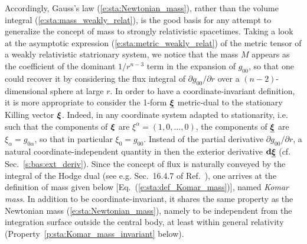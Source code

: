 Accordingly, Gauss's law (\ref{e:sta:Newtonian_mass}), rather than the volume integral
(\ref{e:sta:mass_weakly_relat}), is the good basis for any attempt to
generalize the concept of mass to strongly relativistic spacetimes.
Taking a look at the asymptotic expression (\ref{e:sta:metric_weakly_relat}) of the metric tensor
of a weakly relativistic statrionary system, we notice that
the mass $M$ appears as the coefficient of the dominant $1/r^{n-3}$ term
in the expansion of $g_{00}$, so that one could
recover it by considering the flux integral of $\partial g_{00}/\partial r$ over
a $(n-2)$-dimensional sphere at large $r$. In order to have a coordinate-invariant
definition, it is more appropriate to consider the 1-form $\underline{\bm{\xi}}$ metric-dual
to the stationary Killing vector $\bm{\xi}$. Indeed, in any coordinate system
adapted to stationarity, i.e. such that the components of
$\bm{\xi}$ are $\xi^\alpha=(1,0,\ldots,0)$, the components of $\underline{\bm{\xi}}$
are $\xi_\alpha = g_{0\alpha}$, so that in particular $\xi_0 = g_{00}$.
Instead of the partial derivative $\partial g_{00}/\partial r$, a natural coordinate-independent
quantity in then the exterior derivative $\mathbf{d} \underline{\bm{\xi}}$ (cf. Sec.~\ref{s:bas:ext_deriv}). Since the concept of flux
is naturally conveyed by the integral of the Hodge dual (see e.g. Sec.~16.4.7 of Ref.~\cite{Gourg13}), one arrives at the
definition of mass given below [Eq.~(\ref{e:sta:def_Komar_mass})], named \emph{Komar mass}.
In addition to be coordinate-invariant, it shares the same property as the Newtonian mass (\ref{e:sta:Newtonian_mass}),
namely to be independent from the integration surface outside the central body,
at least within general relativity
(Property~\ref{p:sta:Komar_mass_invariant} below).

